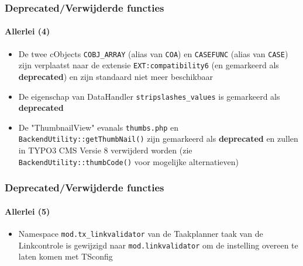 \begin{frame}[fragile]
	\frametitle{Deprecated/Verwijderde functies}
	\framesubtitle{Allerlei (4)}

	\lstset{basicstyle=\tiny\ttfamily}

	\begin{itemize}

		\item De twee cObjects
			\small\texttt{COBJ\_ARRAY}\normalsize\space
			(alias van \texttt{COA})
			en
			\small\texttt{CASEFUNC}\normalsize\space
			(alias van \texttt{CASE})
			zijn verplaatst naar de extensie \texttt{EXT:compatibility6}
			(en gemarkeerd als \textbf{deprecated}) en zijn standaard niet
			meer beschikbaar

		\item De eigenschap van DataHandler
			\small\texttt{stripslashes\_values}\normalsize\space
			is gemarkeerd als \textbf{deprecated}

		\item De "ThumbnailView" evanals \texttt{thumbs.php} en \texttt{BackendUtility::getThumbNail()}
			zijn gemarkeerd als \textbf{deprecated} en zullen in TYPO3 CMS Versie 8 verwijderd worden\newline
			(zie \texttt{BackendUtility::thumbCode()} voor mogelijke alternatieven)

	\end{itemize}

\end{frame}


\begin{frame}[fragile]
	\frametitle{Deprecated/Verwijderde functies}
	\framesubtitle{Allerlei (5)}

	\lstset{basicstyle=\tiny\ttfamily}

	\begin{itemize}

		\item Namespace \texttt{mod.tx\_linkvalidator} van de Taakplanner taak van de Linkcontrole
			is gewijzigd naar \texttt{mod.linkvalidator} om
			de instelling overeen te laten komen met TSconfig

	\end{itemize}

\end{frame}

